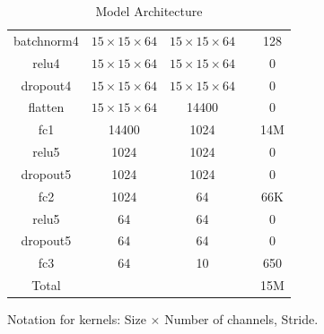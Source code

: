 \documentclass{article}
\begin{document}
\begin{sloppypar}
\begin{center}
\begin{table}[!h]
\begin{tabular}{|c|c|c|c|c|}
                    batchnorm4 & $15\times 15\times 64$ & $15\times 15\times 64$ & & 128\\
                    relu4 & $15\times 15\times 64$ & $15\times 15\times 64$ & & 0\\
                    dropout4 & $15\times 15\times 64$ & $15\times 15\times 64$ & & 0\\
                    \hline
                    flatten & $15\times 15\times 64$ & 14400 & & 0\\
                    \hline
                    fc1 & 14400 & 1024 & & 14M\\
                    relu5 & 1024 & 1024 & & 0\\
                    dropout5 & 1024 & 1024 & & 0\\
                    \hline
                    fc2 & 1024 & 64 & & 66K\\
                    relu5 & 64 & 64 & & 0\\
                    dropout5 & 64 & 64 & & 0\\
                    \hline
                    fc3 & 64 & 10 & & 650\\
                    \hline \hline
                    Total & & & & 15M\\
                    \hline
                \end{tabular}
                \caption{\label{table-1}Model Architecture}
            \end{table}
        \end{center}

        Notation for kernels: Size $\times$ Number of channels, Stride.


\end{sloppypar}
\end{document}
